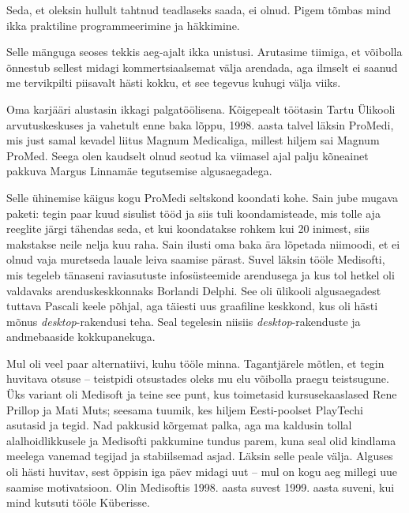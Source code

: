 
Seda, et oleksin hullult tahtnud teadlaseks saada, ei olnud. Pigem tõmbas mind ikka
praktiline programmeerimine ja häkkimine. 


Selle mänguga seoses tekkis aeg-ajalt ikka unistusi. Arutasime tiimiga, et võibolla õnnestub sellest midagi kommertsiaalsemat 
välja arendada, 
aga ilmselt ei saanud me tervikpilti piisavalt hästi 
kokku, et see tegevus kuhugi välja 
viiks. 

Oma karjääri alustasin ikkagi palgatöölisena. Kõigepealt töötasin Tartu Ülikooli arvutuskeskuses ja
vahetult enne baka lõppu, 1998. aasta talvel läksin
ProMedi, mis just samal kevadel liitus Magnum 
Medicaliga, millest hiljem sai Magnum ProMed. Seega
olen kaudselt olnud seotud ka viimasel ajal palju kõneainet pakkuva 
Margus Linnamäe tegutsemise algusaegadega. 

Selle ühinemise käigus kogu ProMedi seltskond koondati kohe. 
Sain jube mugava paketi: tegin paar kuud sisulist tööd ja siis tuli 
koondamisteade, mis tolle aja reeglite järgi tähendas seda, et kui koondatakse 
rohkem kui 20 inimest, siis makstakse neile nelja kuu raha. Sain ilusti 
oma baka ära lõpetada niimoodi, et ei olnud vaja 
muretseda lauale leiva saamise pärast. Suvel läksin tööle
Medisofti, mis tegeleb tänaseni raviasutuste 
infosüsteemide arendusega ja kus tol hetkel oli valdavaks arenduskeskkonnaks 
Borlandi Delphi. See oli ülikooli algusaegadest 
tuttava Pascali keele põhjal, aga täiesti uus graafiline keskkond, kus oli hästi mõnus 
\emph{desktop}-rakendusi teha. Seal tegelesin niisiis
\emph{desktop}-rakenduste ja andmebaaside kokkupanekuga. 

Mul oli veel paar alternatiivi, kuhu tööle 
minna. Tagantjärele mõtlen, et tegin huvitava otsuse -- 
teistpidi otsustades oleks mu elu võibolla praegu teistsugune. Üks variant oli Medisoft ja teine see punt, kus toimetasid kursusekaaslased Rene Prillop 
ja Mati Muts; seesama 
tuumik, kes hiljem Eesti-poolset PlayTechi asutasid ja 
tegid. Nad pakkusid kõrgemat palka, aga ma kaldusin tollal
alalhoidlikkusele ja Medisofti pakkumine tundus parem, kuna seal olid kindlama meelega
vanemad tegijad ja stabiilsemad asjad. Läksin 
selle peale välja. Alguses oli hästi huvitav, sest õppisin
iga päev midagi uut -- mul on kogu aeg millegi uue saamise 
motivatsioon. Olin Medisoftis 1998. aasta suvest 1999. aasta suveni, 
kui mind kutsuti tööle Küberisse. 

